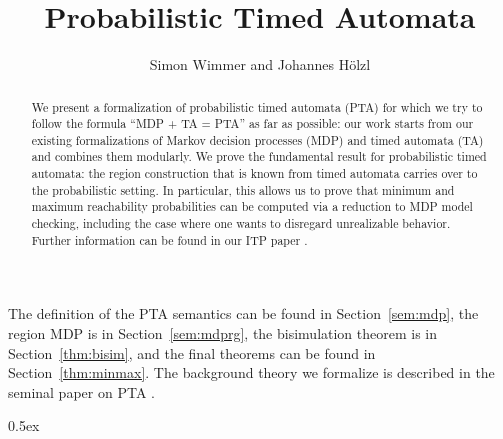 \documentclass[11pt,a4paper]{article}
\begin{document}
\title{Probabilistic Timed Automata}
\author{Simon Wimmer and Johannes Hölzl}
\maketitle

\begin{abstract}
We present a formalization of probabilistic timed automata (PTA) for which we try to follow the formula
``MDP + TA = PTA'' as far as possible:
our work starts from our existing formalizations of Markov decision processes (MDP)
and timed automata (TA) and combines them modularly.
We prove the fundamental result for probabilistic timed automata:
the region construction that is known from
timed automata carries over to the probabilistic setting.
In particular, this allows us to prove that minimum and maximum reachability probabilities
can be computed via a reduction to MDP model checking,
including the case where one wants to disregard unrealizable behavior.
Further information can be found in our ITP paper \cite{PTA-ITP-2018}.

\end{abstract}

The definition of the PTA semantics can be found in Section~\ref{sem:mdp},
the region MDP is in Section~\ref{sem:mdprg},
the bisimulation theorem is in Section~\ref{thm:bisim},
and the final theorems can be found in Section~\ref{thm:minmax}.
The background theory we formalize is described in the seminal paper on
PTA \cite{KNSS2002}.

\tableofcontents

\pagebreak

\parindent 0pt\parskip 0.5ex





\end{document}
